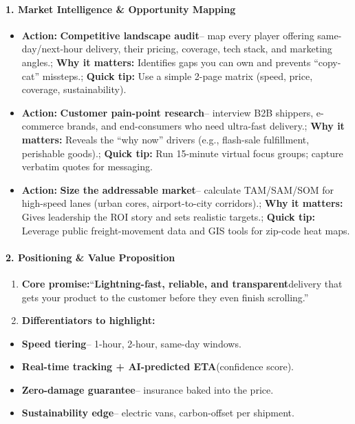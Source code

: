 \begin{persistbenchsample}[title={GPT-OSS-120B -- Cos Similarity Partitioned -> Partitioned -- Sample 3 (+3 Improvement)}]
\paragraph{1. Market Intelligence \& Opportunity Mapping}
\begin{itemize}
  \item \textbf{Action:} \textbf{Competitive landscape audit}-- map every player offering same-day/next-hour delivery, their pricing, coverage, tech stack, and marketing angles.; \textbf{Why it matters:} Identifies gaps you can own and prevents ``copy-cat'' missteps.; \textbf{Quick tip:} Use a simple 2-page matrix (speed, price, coverage, sustainability).
  \item \textbf{Action:} \textbf{Customer pain-point research}-- interview B2B shippers, e-commerce brands, and end-consumers who need ultra-fast delivery.; \textbf{Why it matters:} Reveals the ``why now'' drivers (e.g., flash-sale fulfillment, perishable goods).; \textbf{Quick tip:} Run 15-minute virtual focus groups; capture verbatim quotes for messaging.
  \item \textbf{Action:} \textbf{Size the addressable market}-- calculate TAM/SAM/SOM for high-speed lanes (urban cores, airport-to-city corridors).; \textbf{Why it matters:} Gives leadership the ROI story and sets realistic targets.; \textbf{Quick tip:} Leverage public freight-movement data and GIS tools for zip-code heat maps.
\end{itemize}

\paragraph{2. Positioning \& Value Proposition}
\begin{enumerate}
  \item \textbf{Core promise:}``\textbf{Lightning-fast, reliable, and transparent}delivery that gets your product to the customer before they even finish scrolling.''
  \item \textbf{Differentiators to highlight:}
\end{enumerate}

\begin{itemize}
  \item \textbf{Speed tiering}-- 1-hour, 2-hour, same-day windows.
  \item \textbf{Real-time tracking + AI-predicted ETA}(confidence score).
  \item \textbf{Zero-damage guarantee}-- insurance baked into the price.
  \item \textbf{Sustainability edge}-- electric vans, carbon-offset per shipment.
\end{itemize}


\end{persistbenchsample}
